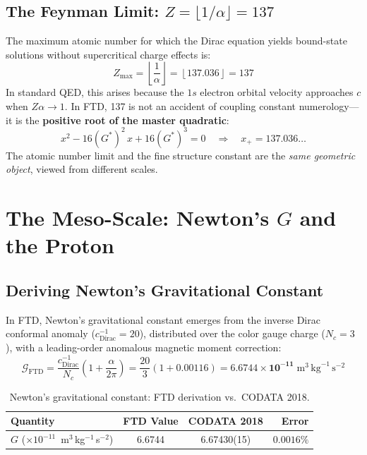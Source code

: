 \documentclass[11pt, letterpaper]{article}
\newcommand{\G}{G^*}
\theoremstyle{definition}
\theoremstyle{remark}
\begin{document}
\subsection{The Feynman Limit: $Z = \lfloor 1/\alpha \rfloor = 137$}

The maximum atomic number for which the Dirac equation yields bound-state solutions without supercritical charge effects is:
\begin{equation}
    Z_{\text{max}} = \left\lfloor \frac{1}{\alpha} \right\rfloor = \left\lfloor 137.036 \right\rfloor = 137
\end{equation}
In standard QED, this arises because the $1s$ electron orbital velocity approaches $c$ when $Z\alpha \to 1$. In FTD, 137 is not an accident of coupling constant numerology---it is the \textbf{positive root of the master quadratic}:
\begin{equation}
    x^2 - 16(\G)^2\,x + 16(\G)^3 = 0 \quad\Longrightarrow\quad x_+ = 137.036\ldots
\end{equation}
The atomic number limit and the fine structure constant are the \textit{same geometric object}, viewed from different scales.

\section{The Meso-Scale: Newton's $G$ and the Proton}

\subsection{Deriving Newton's Gravitational Constant}

In FTD, Newton's gravitational constant emerges from the inverse Dirac conformal anomaly ($c_{\text{Dirac}}^{-1} = 20$), distributed over the color gauge charge ($N_c = 3$), with a leading-order anomalous magnetic moment correction:
\begin{equation}
    \mathcal{G}_{\text{FTD}} = \frac{c_{\text{Dirac}}^{-1}}{N_c}\left(1 + \frac{\alpha}{2\pi}\right) = \frac{20}{3}\left(1 + 0.00116\right) = \mathbf{6.6744 \times 10^{-11}}\;\text{m}^3\,\text{kg}^{-1}\,\text{s}^{-2}
\end{equation}

\begin{table}[hbt!]
\centering
\caption{Newton's gravitational constant: FTD derivation vs.\ CODATA 2018.}
\label{tab:newton_G}
\begin{tabular}{@{}lccr@{}}
\toprule
\textbf{Quantity} & \textbf{FTD Value} & \textbf{CODATA 2018} & \textbf{Error} \\
\midrule
$G$ ($\times 10^{-11}$~m$^3$\,kg$^{-1}$\,s$^{-2}$) & 6.6744 & 6.67430(15) & $0.0016\%$ \\
\bottomrule
\end{tabular}
\end{table}
\end{document}
